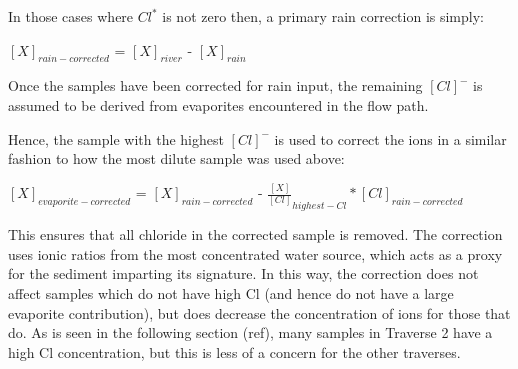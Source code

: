 





In those cases where $Cl^*$ is not zero then, a primary rain correction is simply:


\begin{center}
{\Large
$[X]_{rain-corrected}$  = $[X]_{river}$ - $[X]_{rain}$}

\end{center}

\bsk

Once the samples have been corrected for rain input, the remaining $[Cl]^{-}$ is assumed to be derived from evaporites encountered in the flow path.

\bsk

Hence, the sample with the highest $[Cl]^{-}$ is used to correct the ions in a similar fashion to how the most dilute sample was used above:

\begin{center}
{\Large
$[X]_{evaporite-corrected}$  = $[X]_{rain-corrected}$ - $\frac{[X]}{[Cl]}_{highest-Cl} * [Cl]_{rain-corrected}$}
\end{center}

This ensures that all chloride in the corrected sample is removed. The correction uses ionic ratios from the most concentrated water source, which acts as a proxy for the sediment imparting its signature.  In this way, the correction does not affect samples which do not have high Cl (and hence do not have a large evaporite contribution), but does decrease the concentration of ions for those that do. As is seen in the following section (ref), many samples in Traverse 2 have a high Cl concentration, but this is less of a concern for the other traverses.

